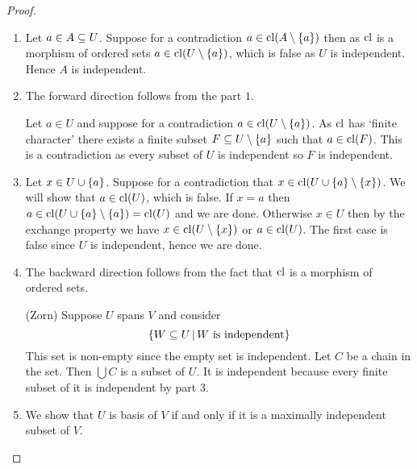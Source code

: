\begin{proof}~
    \begin{enumerate}
        \item Let $a \in A \subseteq U$. 
        Suppose for a contradiction 
        $a \in \operatorname{cl}(A \setminus \left\{a\right\})$ then as $\operatorname{cl}$ is a morphism of 
        ordered sets $a \in \operatorname{cl}(U \setminus \left\{a\right\})$, 
        which is false as $U$ is independent.
        Hence $A$ is independent.
        \item The forward direction follows from the part $1$. 
        
        \begin{backward}
            Let $a \in U$ and suppose for a contradiction 
            $a \in \operatorname{cl}(U \setminus \left\{a\right\})$. 
            As $\operatorname{cl}$ has `finite character' there exists a finite subset 
            $F \subseteq U \setminus \left\{a\right\}$ such that $a \in \operatorname{cl}(F)$.
            This is a contradiction as every subset of $U$ is independent
            so $F$ is independent.
        \end{backward}

        \item Let $x \in U \cup \left\{a\right\}$.
        Suppose for a contradiction that 
        $x \in \operatorname{cl}(U \cup \left\{a\right\} \setminus \left\{x\right\})$.
        We will show that $a \in \operatorname{cl}(U)$, which is false.
        If $x = a$ then $a \in \operatorname{cl}(U \cup \left\{a\right\} \setminus \left\{a\right\}) = \operatorname{cl}(U)$
        and we are done.
        Otherwise $x \in U$ then by the exchange property
        we have $x \in \operatorname{cl}(U \setminus \left\{x\right\})$ or $a \in \operatorname{cl}(U)$.
        The first case is false since $U$ is independent,
        hence we are done.

        \item The backward direction follows from the fact that 
        $\operatorname{cl}$ is a morphism of ordered sets.

        \begin{forward}(Zorn)
            Suppose $U$ spans $V$ and consider 
            \[\left\{W \subseteq U \,|\, W \text{ is independent}\right\}\]
            This set is non-empty since the empty set is independent.
            Let $C$ be a chain in the set. 
            Then $\bigcup C$ is a subset of $U$.
            It is independent because every finite subset of it is independent
            by part $3$.
        \end{forward}
        \item We show that $U$ is basis of $V$ if and only if it is a 
            maximally independent subset of $V$.


\end{enumerate}
\end{proof}
